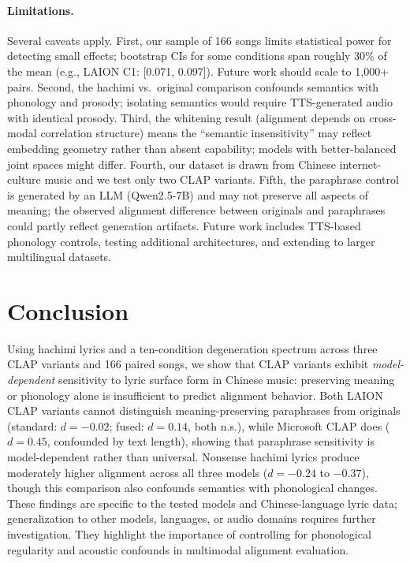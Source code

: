 \documentclass[11pt]{article}
\begin{document}
\paragraph{Limitations.}
Several caveats apply. First, our sample of 166 songs limits statistical power for detecting small effects; bootstrap CIs for some conditions span roughly 30\% of the mean (e.g., LAION C1: [0.071, 0.097]). Future work should scale to 1{,}000+ pairs. Second, the hachimi vs.\ original comparison confounds semantics with phonology and prosody; isolating semantics would require TTS-generated audio with identical prosody. Third, the whitening result (alignment depends on cross-modal correlation structure) means the ``semantic insensitivity'' may reflect embedding geometry rather than absent capability; models with better-balanced joint spaces might differ. Fourth, our dataset is drawn from Chinese internet-culture music and we test only two CLAP variants. Fifth, the paraphrase control is generated by an LLM (Qwen2.5-7B) and may not preserve all aspects of meaning; the observed alignment difference between originals and paraphrases could partly reflect generation artifacts. Future work includes TTS-based phonology controls, testing additional architectures, and extending to larger multilingual datasets.

\section{Conclusion}\label{sec:conclusion}

Using hachimi lyrics and a ten-condition degeneration spectrum across three CLAP variants and 166 paired songs, we show that CLAP variants exhibit \emph{model-dependent} sensitivity to lyric surface form in Chinese music: preserving meaning or phonology alone is insufficient to predict alignment behavior. Both LAION CLAP variants cannot distinguish meaning-preserving paraphrases from originals (standard: $d{=}{-}0.02$; fused: $d{=}0.14$, both n.s.), while Microsoft CLAP does ($d{=}0.45$, confounded by text length), showing that paraphrase sensitivity is model-dependent rather than universal. Nonsense hachimi lyrics produce moderately higher alignment across all three models ($d{=}{-}0.24$ to $-0.37$), though this comparison also confounds semantics with phonological changes. These findings are specific to the tested models and Chinese-language lyric data; generalization to other models, languages, or audio domains requires further investigation. They highlight the importance of controlling for phonological regularity and acoustic confounds in multimodal alignment evaluation.
\end{document}

